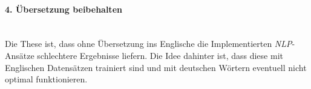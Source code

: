 \paragraph{4. Übersetzung beibehalten}\mbox{}\\
Die These ist, dass ohne Übersetzung ins Englische die Implementierten \emph{NLP}-Ansätze schlechtere Ergebnisse liefern. Die Idee dahinter ist, dass diese mit Englischen Datensätzen trainiert sind und mit deutschen Wörtern eventuell nicht optimal funktionieren.

\newpage
